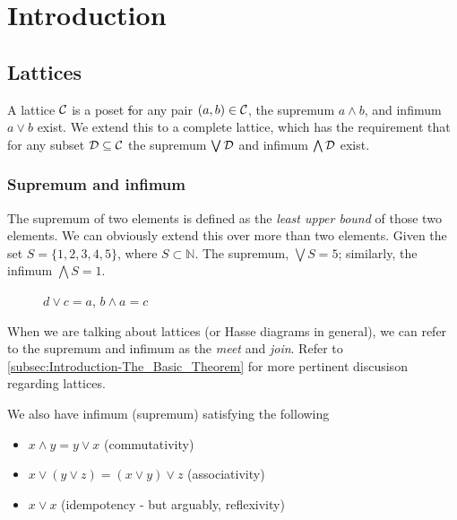 \section{Introduction}
\label{sec:Introduction}
\subsection{Lattices}
\label{subsec:Introduction-Lattices}
A lattice $\mathcal{C}$ is a poset \st for any pair $(a,b) \in \mathcal{C}$, the supremum $a \land b$, and infimum $a \lor b$ exist. We extend this to a complete lattice, which has the requirement that for any subset $\mathcal{D} \subseteq \mathcal{C}$ the supremum $\bigvee \mathcal{D}$ and infimum $\bigwedge \mathcal{D}$ exist. 

\subsubsection{Supremum and infimum} 
\label{subsubsec:Introduction-Lattices-Supremum_and_Infimum}
The supremum of two elements is defined as the \textit{least upper bound} of those two elements. We can obviously extend this over more than two elements. Given the set $S = \{1,2,3,4,5\}$, where $S \subset \mathbb{N}$. The supremum, $\bigvee S = 5$; similarly, the infimum $\bigwedge S = 1$.  

\begin{figure}[h]
    \centering
    \caption{$d \lor c = a$, $b\land a = c$}
    \label{fig:Demostration of Supremum and Infimum in Lattices }
\end{figure}

When we are talking about lattices (or Hasse diagrams in general), we can refer to the supremum and infimum as the \textit{meet} and \textit{join}. Refer to \ref{subsec:Introduction-The_Basic_Theorem} for more pertinent discusison regarding lattices.

We also have infimum (supremum) satisfying the following 
\begin{itemize}
    \item $x \land y = y \lor x$ (commutativity) 
    \item $x \lor (y \lor z) = (x \lor y) \lor z$ (associativity)
    \item $x \lor x$ (idempotency - but arguably, reflexivity)
\end{itemize}

